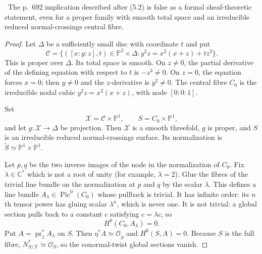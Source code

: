 \begin{theorem}\label{prop:nodal-counterexample}
\Refuted\ The p.~692 implication described after (5.2) is false as a formal
sheaf-theoretic statement, even for a proper family with smooth total space
and an irreducible reduced normal-crossings central fibre.
\end{theorem}

\begin{proof}
Let $\Delta$ be a sufficiently small disc with coordinate $t$ and put
\[
\mathcal C=
\{([x:y:z],t)\in\mathbb P^2\times\Delta:
y^2z=x^2(x+z)+tz^3\}.
\tag{5.8}
\]
This is proper over $\Delta$.  Its total space is smooth.  On $z\ne0$, the
partial derivative of the defining equation with respect to $t$ is
$-z^3\ne0$.  On $z=0$, the equation forces $x=0$; then $y\ne0$ and the
$z$-derivative is $y^2\ne0$.  The central fibre $C_0$ is the irreducible
nodal cubic $y^2z=x^2(x+z)$, with node $[0:0:1]$.

Set
\[
\mathcal X=\mathcal C\times\mathbb P^1,\qquad
S=C_0\times\mathbb P^1,
\]
and let $g:\mathcal X\to\Delta$ be projection.  Then $\mathcal X$ is a
smooth threefold, $g$ is proper, and $S$ is an irreducible reduced
normal-crossings surface.  Its normalization is
$\widetilde S\simeq\mathbb P^1\times\mathbb P^1$.

Let $p,q$ be the two inverse images of the node in the normalization of
$C_0$.  Fix $\lambda\in\mathbb C^*$ which is not a root of unity (for
example, $\lambda=2$).  Glue the fibres of
the trivial line bundle on the normalization at $p$ and $q$ by the scalar
$\lambda$.  This defines a line bundle
$A_\lambda\in\operatorname{Pic}^0(C_0)$ whose pullback is trivial.  It has
infinite order: its $n$th tensor power has gluing scalar $\lambda^n$, which
is never one.  It is not trivial: a global section pulls back to a constant
$c$ satisfying
$c=\lambda c$, so
\[
H^0(C_0,A_\lambda)=0.
\tag{5.9}
\]
Put $A=\operatorname{pr}_1^*A_\lambda$ on $S$.  Then
$\eta^*A\simeq\mathcal O_{\widetilde S}$ and $H^0(S,A)=0$.
Because $S$ is the full fibre,
$N^*_{S/\mathcal X}\simeq\mathcal O_S$, so the conormal-twist global
sections vanish.


\end{proof}
